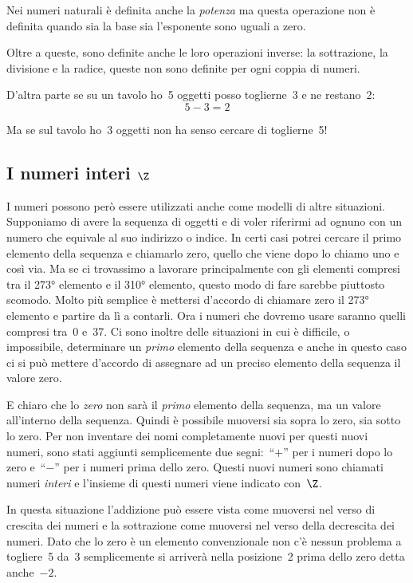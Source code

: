 Nei numeri naturali è definita anche la \emph{potenza} ma questa operazione 
non è definita quando sia la base sia l'esponente sono uguali a zero.

Oltre a queste, sono definite anche le loro operazioni inverse: la 
sottrazione, la divisione e la radice, queste non sono definite per ogni 
coppia di numeri.

D'altra parte se su un tavolo ho~5 oggetti posso toglierne~3 e ne restano~2:
\[5-3=2\]

Ma se sul tavolo ho~3 oggetti non ha senso cercare di toglierne~5!

\subsection{I numeri interi $\Z$}
\label{subsec:insnum_interi}

I numeri possono però essere utilizzati anche come modelli di altre 
situazioni. 
Supponiamo di avere la sequenza di oggetti e di voler riferirmi ad ognuno 
con un numero che equivale al suo indirizzo o indice. In certi casi potrei 
cercare il primo elemento della sequenza e chiamarlo zero, quello che viene 
dopo lo chiamo uno e così via. Ma se ci trovassimo a lavorare principalmente 
con gli elementi compresi tra il 273° elemento e il 310° elemento, questo 
modo di fare sarebbe piuttosto scomodo. 
Molto più semplice è mettersi d'accordo di chiamare zero il 273° elemento e 
partire da lì a contarli. Ora i numeri che dovremo usare saranno quelli 
compresi tra~0 e~37. 
Ci sono inoltre delle situazioni in cui è difficile, o impossibile, 
determinare un \emph{primo} elemento della sequenza e anche in questo caso 
ci si può mettere d'accordo di assegnare ad un preciso elemento della 
sequenza il valore zero.

E chiaro che lo \emph{zero} non sarà il \emph{primo} elemento della 
sequenza, ma un valore all'interno della sequenza. Quindi è possibile 
muoversi sia sopra lo zero, sia sotto lo zero.
Per non inventare dei nomi completamente nuovi per questi nuovi 
numeri, sono stati aggiunti semplicemente due segni:~``$+$'' per i numeri 
dopo lo zero e~``$-$'' per i numeri prima dello zero. 
Questi nuovi numeri sono chiamati numeri \emph{interi} 
e l'insieme di questi numeri viene indicato con~$\Z$.

In questa situazione l'addizione può essere vista come muoversi nel verso 
di crescita dei numeri e la sottrazione come muoversi nel verso della 
decrescita dei numeri. Dato che lo zero è un elemento convenzionale non c'è 
nessun problema a togliere~5 da~3 semplicemente si arriverà nella 
posizione~2 prima dello zero detta anche~$-2$.

